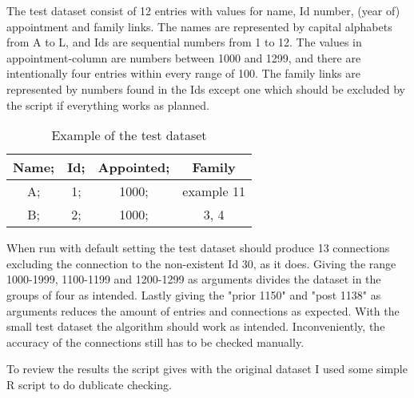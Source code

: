 The test dataset consist of 12 entries with values for name, Id number, (year of) appointment and family links. The names are represented by capital alphabets from A to L, and Ids are sequential numbers from 1 to 12. The values in appointment-column are numbers between 1000 and 1299, and there are intentionally four entries within every range of 100. The family links are represented by numbers found in the Ids except one which should be excluded by the script if everything works as planned. 

\begin{table}
	\caption{Example of the test dataset}
	\centering
	\begin{tabular}{cccc}	
		\hline
		Name; &Id; &Appointed; &Family\\
		\hline
		A; &1; &1000; &example 11\\
		\hline
		B; &2; &1000; &3, 4\\
		\hline
	\end{tabular}
\end{table}

When run with default setting the test dataset should produce 13 connections excluding the connection to the non-existent Id 30, as it does. Giving the range 1000-1999, 1100-1199 and 1200-1299 as arguments divides the dataset in the groups of four as intended. Lastly giving the "prior 1150" and "post 1138" as arguments reduces the amount of entries and connections as expected. With the small test dataset the algorithm should work as intended. Inconveniently, the accuracy of the connections still has to be checked manually. 

To review the results the script gives with the original dataset I used some simple R script to do dublicate checking.